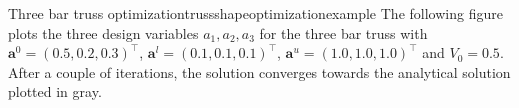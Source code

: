 \begin{example}{Three bar truss optimization}{trussshapeoptimizationexample}
    The following figure plots the three design variables $a_1, a_2, a_3$ for the three bar truss with $\mathbf{a}^0=(0.5,0.2,0.3)^\top$, $\mathbf{a}^l=(0.1,0.1,0.1)^\top$, $\mathbf{a}^u=(1.0,1.0,1.0)^\top$ and $V_0=0.5$. After a couple of iterations, the solution converges towards the analytical solution plotted in gray.
       
\end{example}


 





